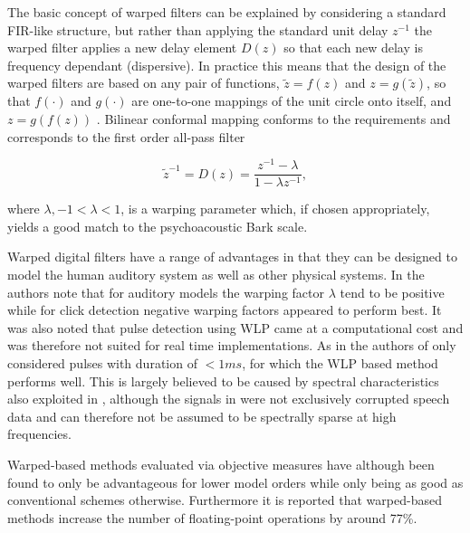 The basic concept of warped filters can be explained by considering a standard FIR-like structure, but rather than applying the standard unit delay $z^{-1}$ the warped filter applies a new delay element $D(z)$ so that each new delay is frequency dependant (dispersive). In practice this means that the design of the warped filters are based on any pair of functions, $\tilde{z} = f(z)$ and $z = g(\tilde{z})$, so that $f(\cdot)$ and $g(\cdot)$ are one-to-one mappings of the unit circle onto itself, and $z = g\left( f(z) \right)$ \cite{Karjalainen1997}. Bilinear conformal mapping\cite{Brown1996} conforms to the requirements and corresponds to the first order all-pass filter

\begin{equation}\label{eq:Karjalainen1997}
\tilde{z}^{-1} = D(z) = \frac{z^{-1} - \lambda}{1 - \lambda z^{-1}},
\end{equation}

where $\lambda, -1 < \lambda < 1$, is a warping parameter which, if chosen appropriately\cite{Karjalainen1997}, yields a good match to the psychoacoustic Bark scale\cite{Smith1995}.

Warped digital filters have a range of advantages in that they can be designed to model the human auditory system as well as other physical systems\cite{Karjalainen1997}. In \cite{Esquef2002} the authors note that for auditory models the warping factor $\lambda$ tend to be positive while for click detection negative warping factors appeared to perform best. It was also noted that pulse detection using WLP came at a computational cost and was therefore not suited for real time implementations. As in \cite{Godsill1998book} the authors of \cite{Esquef2002} only considered pulses with duration of $<1 ms$, for which the WLP based method performs well. This is largely believed to be caused by spectral characteristics also exploited in \cite{Kasparis1993}\cite{US6795559}, although the signals in \cite{Esquef2002} were not exclusively corrupted speech data and can therefore not be assumed to be spectrally sparse at high frequencies.



Warped-based methods evaluated via objective measures have although been found to only be advantageous for lower model orders while only being as good as conventional schemes otherwise\cite{Esquef2003}\cite{Esquef2003a}. Furthermore it is reported that warped-based methods increase the number of floating-point operations by around 77\%\cite{Esquef2003}.

